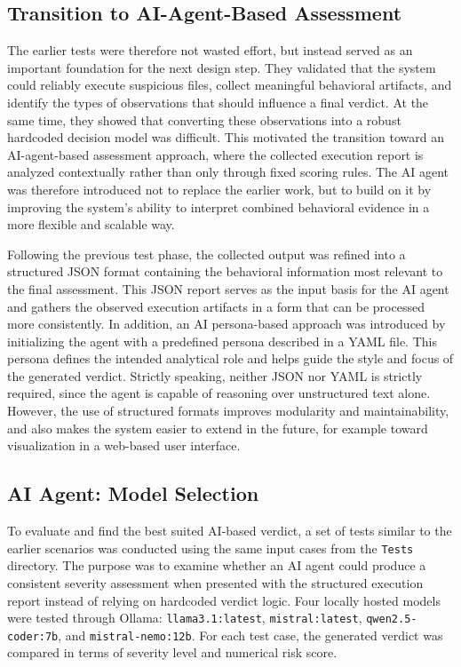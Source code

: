 \subsection{Transition to AI-Agent-Based Assessment}
\noindent
The earlier tests were therefore not wasted effort, but instead served as an important foundation for the next design step. They validated that the system could reliably execute suspicious files, collect meaningful behavioral artifacts, and identify the types of observations that should influence a final verdict. At the same time, they showed that converting these observations into a robust hardcoded decision model was difficult. This motivated the transition toward an AI-agent-based assessment approach, where the collected execution report is analyzed contextually rather than only through fixed scoring rules. The AI agent was therefore introduced not to replace the earlier work, but to build on it by improving the system's ability to interpret combined behavioral evidence in a more flexible and scalable way.

\vspace{1em}

Following the previous test phase, the collected output was refined into a structured JSON format containing the behavioral information most relevant to the final assessment. This JSON report serves as the input basis for the AI agent and gathers the observed execution artifacts in a form that can be processed more consistently. In addition, an AI persona-based approach was introduced by initializing the agent with a predefined persona described in a YAML file. This persona defines the intended analytical role and helps guide the style and focus of the generated verdict. Strictly speaking, neither JSON nor YAML is strictly required, since the agent is capable of reasoning over unstructured text alone. However, the use of structured formats improves modularity and maintainability, and also makes the system easier to extend in the future, for example toward visualization in a web-based user interface.



\subsection{AI Agent: Model Selection}
\noindent
To evaluate and find the best suited AI-based verdict, a set of tests similar to the earlier scenarios was conducted using the same input cases from the \texttt{Tests} directory. The purpose was to examine whether an AI agent could produce a consistent severity assessment when presented with the structured execution report instead of relying on hardcoded verdict logic. Four locally hosted models were tested through Ollama: \texttt{llama3.1:latest}, \texttt{mistral:latest}, \texttt{qwen2.5-coder:7b}, and \texttt{mistral-nemo:12b}. For each test case, the generated verdict was compared in terms of severity level and numerical risk score.

